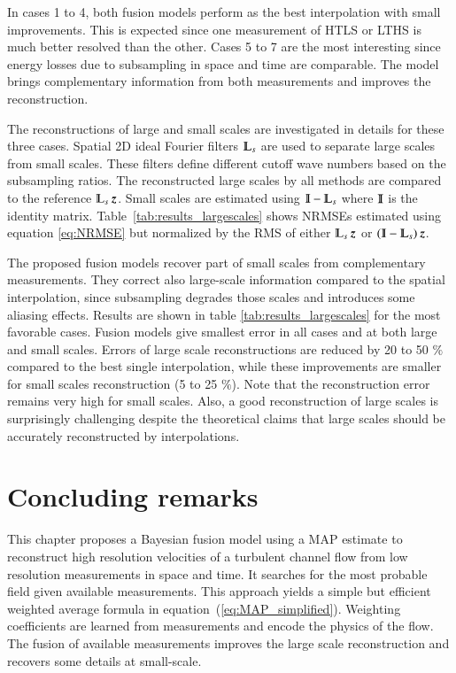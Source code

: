In cases 1 to 4, both fusion models perform as the best interpolation with small improvements. This is expected since one measurement of HTLS or LTHS is much better resolved than the other. Cases 5 to 7  are the most interesting since energy losses due to subsampling in space and time are comparable. The model brings complementary information from both measurements and improves the reconstruction.

The reconstructions of large and small scales are investigated in details for these three cases. Spatial 2D ideal Fourier filters $ \LPF_s $ are used to separate large scales from small scales. These filters define different cutoff wave numbers based on the subsampling ratios. The reconstructed large scales by all methods are compared to the reference $ \LPF_s\z $. Small scales are estimated using $\Interp-\LPF_s $ where $ \Interp $ is the identity matrix. Table~\ref{tab:results_largescales} shows NRMSEs estimated using equation \ref{eq:NRMSE} but normalized by the RMS of either $ \LPF_s\z $ or $(\Interp-\LPF_s)\z  $. 

The proposed fusion models recover part of small scales from complementary measurements. They correct also large-scale information compared to the spatial interpolation, since subsampling degrades those scales and introduces some aliasing effects. Results are shown in table \ref{tab:results_largescales} for the most favorable cases. Fusion models give smallest error in all cases and at both large and small scales. Errors of large scale reconstructions are reduced by 20 to 50 $ \% $ compared to the best single interpolation, while these improvements are smaller for small scales reconstruction (5 to 25 $ \% $). Note that the reconstruction error remains very high for small scales. Also, a good reconstruction of large scales is surprisingly challenging despite the theoretical claims that large scales should be accurately reconstructed by interpolations. 

\section{Concluding remarks}
This chapter proposes a Bayesian fusion model using a MAP estimate to reconstruct high resolution velocities of a turbulent channel flow from low resolution measurements in space and time. It searches for the most probable field given available measurements. This approach yields a simple but efficient weighted average formula in equation~(\ref{eq:MAP_simplified}). Weighting coefficients are learned from measurements and encode the physics of the flow. The fusion of available measurements improves the large scale reconstruction and recovers some details at small-scale.

